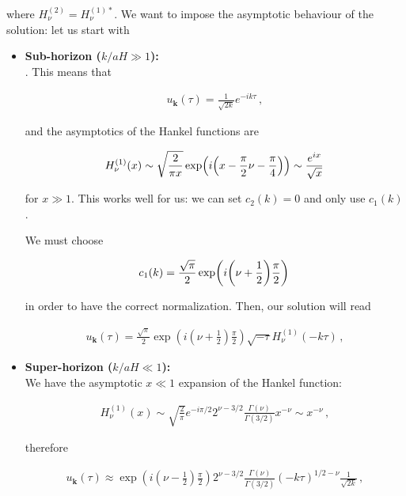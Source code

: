 where \(H^{(2)}_\nu = H^{(1)*}_\nu\). 
We want to impose the asymptotic behaviour of the solution: let us start with 
\begin{itemize}
    \item \textbf{Sub-horizon (\(k / aH \gg 1\)):}\\ . 
    This means that 
    
    \begin{align*}
         u_{\mathbf{k}}(\tau ) = \frac{1}{\sqrt{2k}} e^{-ik \tau }
        \,,
    \end{align*}
        
    
    
    and the asymptotics of the Hankel functions are
    
    \begin{align}
        H^{(1)}_\nu  (x) \sim \sqrt{ \frac{2}{\pi x}} \exp(i \qty(x - \frac{\pi}{2} \nu - \frac{\pi}{4})) \sim \frac{e^{ix}}{\sqrt{x}} \, \label{1.2.96}
    \end{align}
    
    for \(x \gg 1\). This works well for us: we can set \(c_2 (k) = 0\) and only use \(c_1 (k)\). 
    
    We must choose 
    
    \begin{align}
        c_1 (k) = \frac{\sqrt{\pi }}{2} \exp(i \qty(\nu + \frac{1}{2}) \frac{\pi}{2})\,\label{1.2.97}
    \end{align}
    
    in order to have the correct normalization. 
    Then, our solution will read 
    
    \begin{align}
         u_{\mathbf{k}}(\tau ) = \frac{\sqrt{\pi }}{2} \exp(i ( \nu + \frac{1}{2}) \frac{\pi}{2}) \sqrt{-\tau } H^{(1)}_\nu (- k \tau )
        \,,\label{1.2.98}
    \end{align}
    \item \textbf{Super-horizon (\(k /aH \ll 1\)):}\\
    We have the asymptotic \(x \ll 1\) expansion of the Hankel function:

    \begin{align}
        H^{(1)}_\nu (x) \sim \sqrt{ \frac{2}{\pi }} e^{- i \pi /2}
        2^{\nu - 3/2} \frac{\Gamma (\nu )}{\Gamma (3/2)} x^{-\nu } \sim x^{-\nu }
        \,,\label{1.2.99}
    \end{align}
    
    therefore 
    
    \begin{align}
         u_{\mathbf{k}}(\tau ) \approx \exp(i (\nu - \frac{1}{2}) \frac{\pi}{2})
        2^{\nu - 3/2}
        \frac{\Gamma (\nu )}{\Gamma (3/2)}
        (- k \tau )^{1/2 - \nu } \frac{1}{\sqrt{2 k}} 
        \,,\label{1.2.100}
    \end{align}
\end{itemize}

